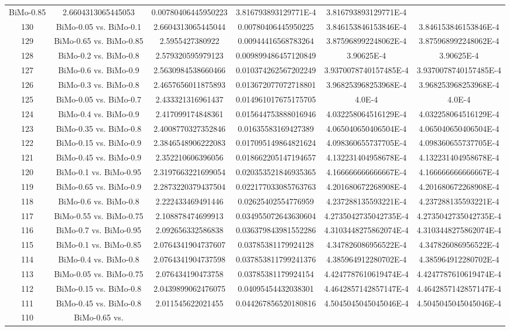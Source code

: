 \documentclass[a4paper,10pt]{article}
\begin{document}
\begin{landscape}
\begin{table}[!htp]
\begin{tabular}{cccccc}
BiMo-0.85&2.6604313065445053&0.00780406445950223&3.816793893129771E-4&3.816793893129771E-4\\130&BiMo-0.05 vs. BiMo-0.1&2.6604313065445044&0.00780406445950225&3.846153846153846E-4&3.846153846153846E-4\\129&BiMo-0.65 vs. BiMo-0.85&2.5955427380922&0.00944416568783264&3.875968992248062E-4&3.875968992248062E-4\\128&BiMo-0.2 vs. BiMo-0.8&2.579320595979123&0.009899486457120849&3.90625E-4&3.90625E-4\\127&BiMo-0.6 vs. BiMo-0.9&2.5630984538660466&0.010374262567202249&3.9370078740157485E-4&3.9370078740157485E-4\\126&BiMo-0.3 vs. BiMo-0.8&2.4657656011875893&0.013672077072718801&3.968253968253968E-4&3.968253968253968E-4\\125&BiMo-0.05 vs. BiMo-0.7&2.433321316961437&0.014961017675175705&4.0E-4&4.0E-4\\124&BiMo-0.4 vs. BiMo-0.9&2.417099174848361&0.015644753888016946&4.032258064516129E-4&4.032258064516129E-4\\123&BiMo-0.35 vs. BiMo-0.8&2.4008770327352846&0.01635583169427389&4.065040650406504E-4&4.065040650406504E-4\\122&BiMo-0.15 vs. BiMo-0.9&2.3846548906222083&0.017095149864821624&4.098360655737705E-4&4.098360655737705E-4\\121&BiMo-0.45 vs. BiMo-0.9&2.352210606396056&0.018662205147194657&4.132231404958678E-4&4.132231404958678E-4\\120&BiMo-0.1 vs. BiMo-0.95&2.3197663221699054&0.020353521846935365&4.166666666666667E-4&4.166666666666667E-4\\119&BiMo-0.65 vs. BiMo-0.9&2.2873220379437504&0.022177033085763763&4.201680672268908E-4&4.201680672268908E-4\\118&BiMo-0.6 vs. BiMo-0.8&2.222433469491446&0.02625402554776959&4.237288135593221E-4&4.237288135593221E-4\\117&BiMo-0.55 vs. BiMo-0.75&2.108878474699913&0.034955072643630604&4.2735042735042735E-4&4.2735042735042735E-4\\116&BiMo-0.7 vs. BiMo-0.95&2.092656332586838&0.036379843981552286&4.3103448275862074E-4&4.3103448275862074E-4\\115&BiMo-0.1 vs. BiMo-0.85&2.0764341904737607&0.03785381179924128&4.347826086956522E-4&4.347826086956522E-4\\114&BiMo-0.4 vs. BiMo-0.8&2.0764341904737598&0.037853811799241376&4.385964912280702E-4&4.385964912280702E-4\\113&BiMo-0.05 vs. BiMo-0.75&2.076434190473758&0.03785381179924154&4.4247787610619474E-4&4.4247787610619474E-4\\112&BiMo-0.15 vs. BiMo-0.8&2.0439899062476075&0.04095454432038301&4.4642857142857147E-4&4.4642857142857147E-4\\111&BiMo-0.45 vs. BiMo-0.8&2.011545622021455&0.044267856520180816&4.5045045045045046E-4&4.5045045045045046E-4\\110&BiMo-0.65 vs. 
\end{tabular}
\end{table}
\end{landscape}
\end{document}
